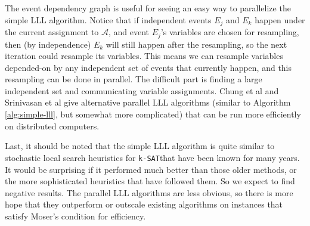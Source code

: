 \documentclass{article}
\newcommand{\ksat}{\texttt{k-SAT}}
\begin{document}
The event dependency graph is useful for seeing an easy way to parallelize the simple LLL algorithm.  Notice that if independent events $E_j$ and $E_k$ happen under the current assignment to $\mathcal{A}$, and event $E_j$'s variables are chosen for resampling, then (by independence) $E_k$ will still happen after the resampling, so the next iteration could resample its variables.  This means we can resample variables depended-on by any independent set of events that currently happen, and this resampling can be done in parallel.  The difficult part is finding a large independent set and communicating variable assignments.  Chung et al \cite{chung2014distributed} and Srinivasan et al \cite{haeupler2011new} give alternative parallel LLL algorithms (similar to Algorithm \ref{alg:simple-lll}, but somewhat more complicated) that can be run more efficiently on distributed computers.

Last, it should be noted that the simple LLL algorithm is quite similar to stochastic local search heuristics for \ksat that have been known for many years.  It would be surprising if it performed much better than those older methods, or the more sophisticated heuristics that have followed them.  So we expect to find negative results.  The parallel LLL algorithms are less obvious, so there is more hope that they outperform or outscale existing algorithms on instances that satisfy Moser's condition for efficiency.




\end{document}
